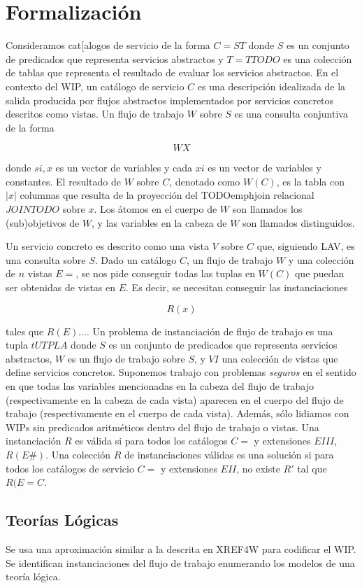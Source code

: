 \documentclass{article}
\begin{document}
\section{Formalización}

Consideramos cat[alogos de servicio de la forma $C = ST$ donde $S$ es un
conjunto de predicados que representa servicios abstractos y $T=TTODO$ es una
colección de tablas que representa el resultado de evaluar los servicios
abstractos. En el contexto del WIP, un catálogo de servicio $C$ es una
descripción idealizada de la salida producida por flujos abstractos
implementados por servicios concretos descritos como vistas. Un flujo de trabajo
$W$ sobre $S$ es una consulta conjuntiva de la forma

$$
WX
$$

donde $si,x$ es un vector de variables y cada $xi$ es un vector de variables y
constantes. El resultado de $W$ sobre $C$, denotado como $W(C)$, es la tabla con
$|x|$ columnas que resulta de la proyección del TODOemphjoin relacional
$JOINTODO$ sobre $x$. Los átomos en el cuerpo de $W$ son llamados los
(sub)objetivos de $W$, y las variables en la cabeza de $W$ son llamados
distinguidos.

Un servicio concreto es descrito como una vista $V$ sobre $C$ que, siguiendo
LAV, es una consulta sobre $S$. Dado un catálogo $C$, un flujo de trabajo $W$ y
una colección de $n$ vistas $E=$, se nos pide conseguir todas las tuplas en
$W(C)$ que puedan ser obtenidas de vistas en $E$. Es decir, se necesitan
conseguir las instanciaciones

$$
R(x)
$$

tales que $R(E)...$. Un problema de instanciación de flujo de trabajo es una
tupla $tUTPLA$ donde $S$ es un conjunto de predicados que representa servicios
abstractos, $W$ es un flujo de trabajo sobre $S$, y $VI$ una colección de vistas
que define servicios concretos. Suponemos trabajo con problemas \emph{seguros}
en el sentido en que todas las variables mencionadas en la cabeza del flujo de
trabajo (respectivamente en la cabeza de cada vista) aparecen en el cuerpo del
flujo de trabajo (respectivamente en el cuerpo de cada vista). Además, sólo
lidiamos con WIPs sin predicados aritméticos dentro del flujo de trabajo o
vistas. Una instanciación $R$ es válida si para todos los catálogos $C=$ y
extensiones $EIII$, $R(E\#)$. Una colección $R$ de instanciaciones válidas es una
solución si para todos los catálogos de servicio $C=$ y extensiones $EII$, no
existe $R'$ tal que $R(E= C$.

\subsection{Teorías Lógicas}

Se usa una aproximación similar a la descrita en XREF4W para codificar el WIP.
Se identifican instanciaciones del flujo de trabajo enumerando los modelos de
una teoría lógica.
\end{document}
